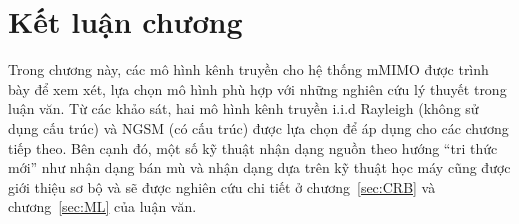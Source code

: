 \section{Kết luận chương}

Trong chương này, các mô hình kênh truyền cho hệ thống mMIMO được trình bày để xem xét, lựa chọn mô hình phù hợp với những nghiên cứu lý thuyết trong luận văn. Từ các khảo sát, hai mô hình kênh truyền i.i.d Rayleigh (không sử dụng cấu trúc) và NGSM (có cấu trúc) được lựa chọn để áp dụng cho các chương tiếp theo. Bên cạnh đó, một số kỹ thuật nhận dạng nguồn theo hướng ``tri thức mới'' như nhận dạng bán mù và nhận dạng dựa trên kỹ thuật học máy cũng được giới thiệu sơ bộ và sẽ được nghiên cứu chi tiết ở chương~\ref{sec:CRB} và chương~\ref{sec:ML} của luận văn.

